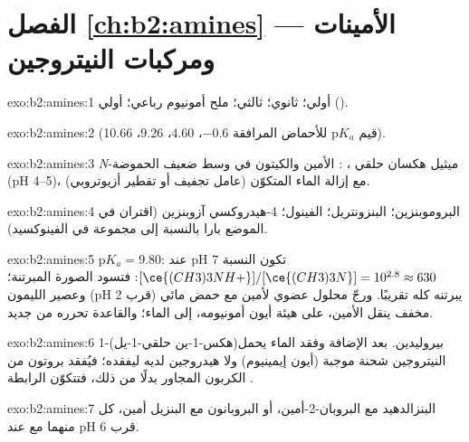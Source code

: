 \section*{الفصل \ref{ch:b2:amines} --- الأمينات ومركبات النيتروجين}

\begin{solution}{exo:b2:amines:1}
أولي؛ ثانوي؛ ثالثي؛ ملح أمونيوم رباعي؛ أولي ().
\end{solution}

\begin{solution}{exo:b2:amines:2}
 (قيم $\mathrm pK_a$ للأحماض المرافقة
$-0.6$، 4.60، 9.26، 10.66).
\end{solution}

\begin{solution}{exo:b2:amines:3}
\textit{N}-ميثيل هكسان حلقي ، : الأمين والكيتون في وسط ضعيف الحموضة
(pH 4--5)، مع إزالة الماء المتكوّن (عامل تجفيف أو تقطير أزيوتروبي).
\end{solution}

\begin{solution}{exo:b2:amines:4}
البروموبنزين؛ البنزونتريل؛ الفينول؛ 4-هيدروكسي آزوبنزين  (اقتران في الموضع بارا بالنسبة إلى
مجموعة  في الفينوكسيد).
\end{solution}

\begin{solution}{exo:b2:amines:5}
$\mathrm pK_a = 9.80$: عند pH 7 تكون النسبة $[\ce{(CH3)3NH+}]/[\ce{(CH3)3N}] = 10^{2.8} \approx 630$: فتسود
الصورة المبرتنة؛ وعصير الليمون (pH قرب 2) يبرتنه كله تقريبًا. ورجّ محلول
عضوي لأمين مع حمض مائي مخفف ينقل الأمين، على هيئة أيون أمونيومه،
إلى الماء؛ والقاعدة تحرره من جديد.
\end{solution}

\begin{solution}{exo:b2:amines:6}
1-(هكس-1-ين حلقي-1-يل)بيروليدين. بعد الإضافة وفقد الماء يحمل النيتروجين
شحنة موجبة (أيون إيمينيوم) ولا هيدروجين لديه ليفقده؛ فيُفقد بروتون من الكربون
المجاور بدلًا من ذلك، فتتكوّن الرابطة .
\end{solution}

\begin{solution}{exo:b2:amines:7}
البنزالدهيد مع البروبان-2-أمين، أو البروبانون مع البنزيل أمين، كل منهما مع  عند pH
قرب 6.
\end{solution}

